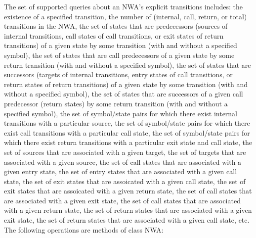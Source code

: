 \documentclass{llncs}
\begin{document}
The set of supported queries about an NWA's explicit transitions includes: the existence of a specified transition, the number of (internal, call, return, or total) transitions in the NWA, the set of states that are predecessors (sources of internal transitions, call states of call transitions, or exit states of return transitions) of a given state by some transition (with and without a specified symbol), the set of states that are call predecessors of a given state by some return transition (with and without a specified symbol), the set of states that are successors (targets of internal transitions, entry states of call transitions, or return states of return transitions) of a given state by some transition (with and without a specified symbol), the set of states that are successors of a given call predecessor (return states) by some return transition (with and without a specified symbol), the set of symbol/state pairs for which there exist internal transitions with a particular source, the set of symbol/state pairs for which there exist call transitions with a particular call state, the set of symbol/state pairs for which there exist return transitions with a particular exit state and call state, the set of sources that are associated with a given target, the set of targets that are associated with a given source, the set of call states that are associated with a given entry state, the set of entry states that are associated with a given call state, the set of exit states that are assoicated with a given call state, the set of exit states that are assoicated with a given return state, the set of call states that are associated with a given exit state, the set of call states that are associated with a given return state, the set of return states that are associated with a given exit state, the set of return states that are associated with a given call state, etc. \\

\noindent The following operations are methods of class NWA:
\end{document}
